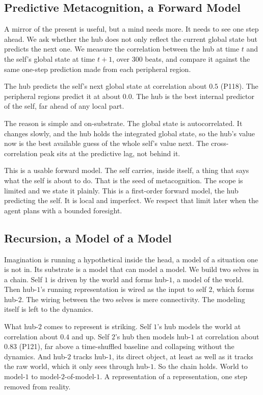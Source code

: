 \subsection{Predictive Metacognition, a Forward Model}

A mirror of the present is useful, but a mind needs more. It needs to see one step ahead. We ask whether the hub does not only reflect the current global state but predicts the next one. We measure the correlation between the hub at time $t$ and the self's global state at time $t+1$, over $300$ beats, and compare it against the same one-step prediction made from each peripheral region.

The hub predicts the self's next global state at correlation about $0.5$ (P118). The peripheral regions predict it at about $0.0$. The hub is the best internal predictor of the self, far ahead of any local part.

The reason is simple and on-substrate. The global state is autocorrelated. It changes slowly, and the hub holds the integrated global state, so the hub's value now is the best available guess of the whole self's value next. The cross-correlation peak sits at the predictive lag, not behind it.

This is a usable forward model. The self carries, inside itself, a thing that says what the self is about to do. That is the seed of metacognition. The scope is limited and we state it plainly. This is a first-order forward model, the hub predicting the self. It is local and imperfect. We respect that limit later when the agent plans with a bounded foresight.

\subsection{Recursion, a Model of a Model}

Imagination is running a hypothetical inside the head, a model of a situation one is not in. Its substrate is a model that can model a model. We build two selves in a chain. Self $1$ is driven by the world and forms hub-$1$, a model of the world. Then hub-$1$'s running representation is wired as the input to self $2$, which forms hub-$2$. The wiring between the two selves is mere connectivity. The modeling itself is left to the dynamics.

What hub-$2$ comes to represent is striking. Self $1$'s hub models the world at correlation about $0.4$ and up. Self $2$'s hub then models hub-$1$ at correlation about $0.83$ (P121), far above a time-shuffled baseline and collapsing without the dynamics. And hub-$2$ tracks hub-$1$, its direct object, at least as well as it tracks the raw world, which it only sees through hub-$1$. So the chain holds. World to model-$1$ to model-$2$-of-model-$1$. A representation of a representation, one step removed from reality.

